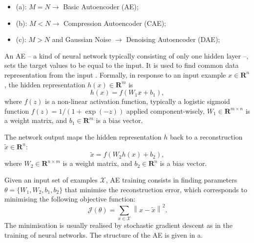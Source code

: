 \begin{itemize}
	\item (a):  $M=N \rightarrow$ Basic Autoencoder (AE);
	\item (b):  $M<N \rightarrow$ Compression Autoencoder (CAE);
	\item (c):  $M>N$ and Gaussian Noise $\rightarrow$ Denoising Autoencoder (DAE);
\end{itemize}



An AE -- a kind of neural network typically consisting of only one hidden layer --, sets the target values to be equal to the input. It is used to find common data representation from the input \cite{Goodfellow2009-MII,Bengio2007-GLT}. Formally, in response to an input example $x\in \mathbf{R}^{n}$, the hidden representation
$h(x) \in \mathbf{R}^{m}$ is 
\begin{equation} %
h(x) = f(W_{1}x +b_{1}), 
\end{equation}
where $f(z)$ is a non-linear activation function, typically a logistic
sigmoid function $f(z) = 1/(1+\exp(-z)) $ applied component-wisely,
$W_{1} \in \mathbf{R}^{m \times n}$ is a weight matrix, and $b_{1} \in
\mathbf{R}^{m}$ is a bias vector.

The network output maps the hidden representation $h$ back to a
reconstruction $\tilde{x} \in \mathbf{R}^{n}$:
\begin{equation} %
\tilde{x} = f(W_{2}h(x) +b_{2}), 
\end{equation}
where $W_{2} \in \mathbf{R}^{n \times m}$ is a weight matrix, and $b_{2} \in
\mathbf{R}^{n}$ is a bias vector.

Given an input set of examples $\mathcal{X}$, AE training consists
in finding parameters $\theta=\{W_{1},W_{2},b_{1},b_{2}\}$ that
minimise the reconstruction error, which corresponds to minimising
the following objective function:
\begin{equation} %
\mathcal{J}(\theta)=\sum_{x\in{\mathcal{X}}}\left\| x -
\tilde{x}\right\|^{2}.
\end{equation}
The minimisation is usually realised by stochastic gradient descent as
in the training of neural networks. The structure of the AE is given in a.   




